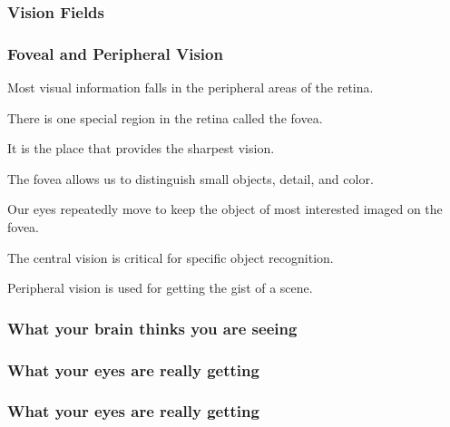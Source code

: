 \documentclass[12pt]{beamer}\usepackage[]{graphicx}\usepackage[]{color}
\begin{document}

\begin{frame}
\frametitle{Vision Fields}
\begin{center}
\end{center}
\end{frame}


\begin{frame}
\frametitle{Foveal and Peripheral Vision}

\bbi
  \item Most visual information falls in the peripheral areas of the retina.
  \item There is one special region in the retina called the fovea.
  \item It is the place that provides the sharpest vision.
  \item The fovea allows us to distinguish small objects, detail, and color.
  \item Our eyes repeatedly move to keep the object of most interested imaged
  on the fovea.
  \item The central vision is critical for specific object recognition.
  \item Peripheral vision is used for getting the gist of a scene.
\ei

\end{frame}


\begin{frame}
\frametitle{What your brain thinks you are seeing}
\begin{center}
\end{center}
\end{frame}


\begin{frame}
\frametitle{What your eyes are really getting}
\begin{center}
\end{center}
\end{frame}


\begin{frame}
\frametitle{What your eyes are really getting}
\begin{center}
\end{center}
\end{frame}
\end{document}
